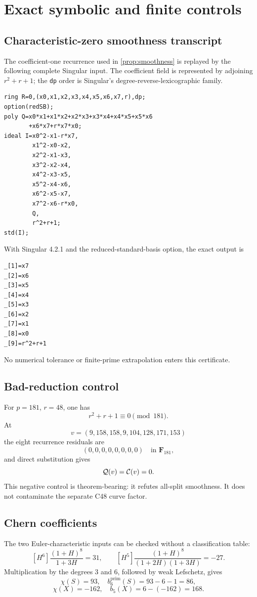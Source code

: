 \section{Exact symbolic and finite controls}\label{app:certificates}

\subsection{Characteristic-zero smoothness transcript}

The coefficient-one recurrence used in
\cref{prop:smoothness} is replayed by the following complete Singular input.
The coefficient field is represented by adjoining \(r^2+r+1\); the
\texttt{dp} order is Singular's degree-reverse-lexicographic family.

\begin{verbatim}
ring R=0,(x0,x1,x2,x3,x4,x5,x6,x7,r),dp;
option(redSB);
poly Q=x0*x1+x1*x2+x2*x3+x3*x4+x4*x5+x5*x6
       +x6*x7+r*x7*x0;
ideal I=x0^2-x1-r*x7,
        x1^2-x0-x2,
        x2^2-x1-x3,
        x3^2-x2-x4,
        x4^2-x3-x5,
        x5^2-x4-x6,
        x6^2-x5-x7,
        x7^2-x6-r*x0,
        Q,
        r^2+r+1;
std(I);
\end{verbatim}

With Singular 4.2.1 and the reduced-standard-basis option, the exact output
is
\begin{verbatim}
_[1]=x7
_[2]=x6
_[3]=x5
_[4]=x4
_[5]=x3
_[6]=x2
_[7]=x1
_[8]=x0
_[9]=r^2+r+1
\end{verbatim}
No numerical tolerance or finite-prime extrapolation enters this
certificate.

\subsection{Bad-reduction control}

For \(p=181\), \(r=48\), one has
\[
 r^2+r+1\equiv0\pmod{181}.
\]
At
\[
 v=(9,158,158,9,104,128,171,153)
\]
the eight recurrence residuals are
\[
 (0,0,0,0,0,0,0,0)\quad\text{in }\mathbf F_{181},
\]
and direct substitution gives
\[
 \mathcal Q(v)=\mathcal C(v)=0.
\]
This negative control is theorem-bearing: it refutes all-split smoothness.
It does not contaminate the separate C48 curve factor.

\subsection{Chern coefficients}

The two Euler-characteristic inputs can be checked without a classification
table:
\[
 [H^6]\frac{(1+H)^8}{1+3H}=31,\qquad
 [H^5]\frac{(1+H)^8}{(1+2H)(1+3H)}=-27.                \tag{A.1}
\]
Multiplication by the degrees \(3\) and \(6\), followed by weak Lefschetz,
gives
\[
 \chi(S)=93,\quad b_6^{\mathrm{prim}}(S)=93-6-1=86,
\]
\[
 \chi(X)=-162,\quad b_5(X)=6-(-162)=168.
\]

